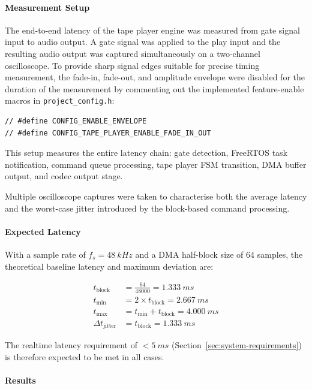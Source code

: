 \paragraph{Measurement Setup}

The end-to-end latency of the tape player engine was measured from gate signal 
input to audio output. A gate signal was applied to the play input and the 
resulting audio output was captured simultaneously on a two-channel oscilloscope. 
To provide sharp signal edges suitable for precise timing measurement, the fade-in, 
fade-out, and amplitude envelope were disabled for the duration of the measurement by commenting out the implemented feature-enable macros in \texttt{project\_config.h}:

\begin{verbatim}
// #define CONFIG_ENABLE_ENVELOPE
// #define CONFIG_TAPE_PLAYER_ENABLE_FADE_IN_OUT
\end{verbatim}

This setup measures the entire latency chain: gate detection, FreeRTOS task 
notification, command queue processing, tape player FSM transition, DMA buffer 
output, and codec output stage.

Multiple oscilloscope captures were taken to characterise both the average latency 
and the worst-case jitter introduced by the block-based command processing.

\newpage
\paragraph{Expected Latency}

With a sample rate of $f_s = \qty{48}{kHz}$ and a DMA half-block size of 64 
samples, the theoretical baseline latency and maximum deviation are:

\begin{align}
	t_{\text{block}}         &= \frac{64}{48000} = \qty{1.333}{ms} \\
	t_{\text{min}}           &= 2 \times t_{\text{block}} = \qty{2.667}{ms} \\
	t_{\text{max}}           &= t_{\text{min}} + t_{\text{block}} = \qty{4.000}{ms} \\
	\Delta t_{\text{jitter}} &= t_{\text{block}} = \qty{1.333}{ms}
\end{align}

The realtime latency requirement of $< \qty{5}{ms}$ (Section~\ref{sec:system-requirements}) is 
therefore expected to be met in all cases.

\paragraph{Results}

